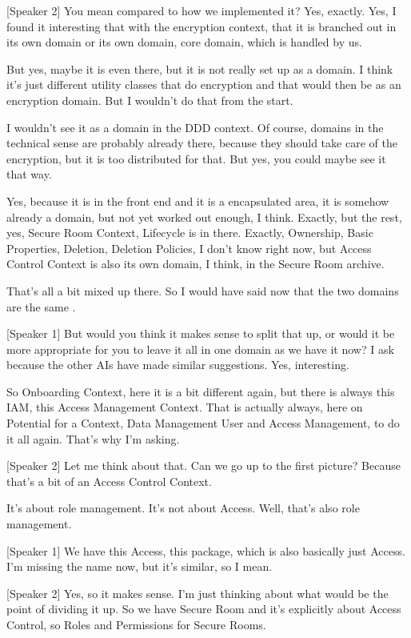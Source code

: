 [Speaker 2]
You mean compared to how we implemented it? Yes, exactly. Yes, I found it interesting that with the encryption context, that it is branched out in its own domain or its own domain, core domain, which is handled by us.

But yes, maybe it is even there, but it is not really set up as a domain. I think it's just different utility classes that do encryption and that would then be as an encryption domain. But I wouldn't do that from the start.

I wouldn't see it as a domain in the DDD context. Of course, domains in the technical sense are probably already there, because they should take care of the encryption, but it is too distributed for that. But yes, you could maybe see it that way.

Yes, because it is in the front end and it is a encapsulated area, it is somehow already a domain, but not yet worked out enough, I think. Exactly, but the rest, yes, Secure Room Context, Lifecycle is in there. Exactly, Ownership, Basic Properties, Deletion, Deletion Policies, I don't know right now, but Access Control Context is also its own domain, I think, in the Secure Room archive.

That's all a bit mixed up there. So I would have said now that the two domains are the same .

[Speaker 1]
But would you think it makes sense to split that up, or would it be more appropriate for you to leave it all in one domain as we have it now? I ask because the other AIs have made similar suggestions. Yes, interesting.

So Onboarding Context, here it is a bit different again, but there is always this IAM, this Access Management Context. That is actually always, here on Potential for a Context, Data Management User and Access Management, to do it all again. That's why I'm asking.

[Speaker 2]
Let me think about that. Can we go up to the first picture? Because that's a bit of an Access Control Context.

It's about role management. It's not about Access. Well, that's also role management.

[Speaker 1]
We have this Access, this package, which is also basically just Access. I'm missing the name now, but it's similar, so I mean.

[Speaker 2]
Yes, so it makes sense. I'm just thinking about what would be the point of dividing it up. So we have Secure Room and it's explicitly about Access Control, so Roles and Permissions for Secure Rooms.

